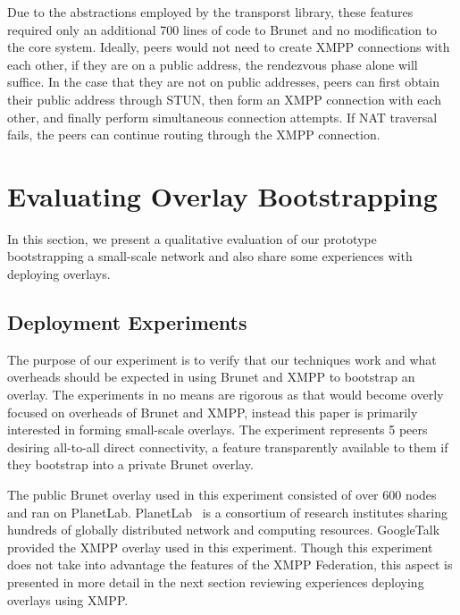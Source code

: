 \documentclass[conference]{IEEEtran}
\begin{document}
Due to the abstractions employed by the transporst library, these features
required only an additional 700 lines of code to Brunet and no modification to
the core system.  Ideally, peers would not need to create XMPP connections with
each other, if they are on a public address, the rendezvous phase alone will
suffice.  In the case that they are not on public addresses, peers can first
obtain their public address through STUN, then form an XMPP connection with
each other, and finally perform simultaneous connection attempts.  If NAT
traversal fails, the peers can continue routing through the XMPP connection.

\section{Evaluating Overlay Bootstrapping}
\label{evaluations}
In this section, we present a qualitative evaluation of our prototype
bootstrapping a small-scale network and also share some experiences with
deploying overlays.

\subsection{Deployment Experiments}

The purpose of our experiment is to verify that our techniques work and what
overheads should be expected in using Brunet and XMPP to bootstrap an overlay.
The experiments in no means are rigorous as that would become overly focused on
overheads of Brunet and XMPP, instead this paper is primarily interested in
forming small-scale overlays.  The experiment represents 5 peers desiring
all-to-all direct connectivity, a feature transparently available to them if
they bootstrap into a private Brunet overlay.

The public Brunet overlay used in this experiment consisted of over 600 nodes
and ran on PlanetLab.  PlanetLab~\cite{planetlab} is a consortium of research
institutes sharing hundreds of globally distributed network and computing
resources.  GoogleTalk provided the XMPP overlay used in this experiment.
Though this experiment does not take into advantage the features of the XMPP
Federation, this aspect is presented in more detail in the next section
reviewing experiences deploying overlays using XMPP.
\end{document}
